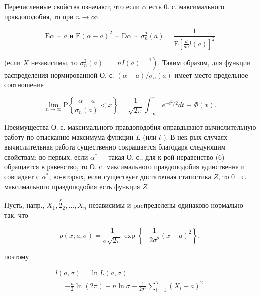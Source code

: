 \documentclass[10pt]{article}
\begin{document}
Перечисленные свойства означают, что если $\alpha$ есть 0. с. максимального правдоподобия, то при $n \rightarrow \infty$



\[

\mathrm{E} \alpha \sim a \text { и } \mathrm{E}(\alpha-a)^{2} \sim \mathrm{D} \alpha \sim \sigma_{n}^{2}(a)=\frac{1}{\mathrm{E}\left[\frac{d}{d a} l(a)\right]^{2}}

\]



(если $X$ независимы, то $\left.\sigma_{n}^{2}(a)=[n I(a)]^{-1}\right)$. Таким образом, для функции распределения нормированной О. с. $(\alpha-a) / \sigma_{n}(a)$ имеет место предельное соотношение



\[

\lim _{n \rightarrow \infty} \mathrm{P}\left\{\frac{\alpha-a}{\sigma_{n}(a)}<x\right\}=\frac{1}{\sqrt{2 \pi}} \int_{-\infty}^{x} e^{-t^{2} / 2} d t \equiv \Phi(x) .

\]



Преимущества О. с. максимального правдоподобия оправдывают вычислительную работу по отысканию максимума функции $L$ (или $l$ ). В нек-рых случаях вычислительная работа существенно сокращается благодаря следующим свойствам: во-первых, если $\alpha^{*}-$ такая О. с., для к-рой неравенство (6) обращается в равенство, то О. с. максимального правдоподобия единственна и совпадает с $\alpha^{*}$, во-вторых, если существует достаточная статистика $Z$, то 0 . с. максимального правдоподобия есть функция $Z$.



Пусть, напр., $X_{1}, \stackrel{X}{2}_{2}, \ldots, X_{n}$ независимы и pacпределены одинаково нормально так, что



\[

p(x ; a, \sigma)=\frac{1}{\sigma \sqrt{2 \pi}} \exp \left\{-\frac{1}{2 \sigma^{2}}(x-a)^{2}\right\},

\]



поэтому



\[

\begin{gathered}

l(a, \sigma)=\ln L(a, \sigma)= \\

=-\frac{n}{2} \ln (2 \pi)-n \ln \sigma-\frac{1}{2 \sigma^{2}} \sum_{i=1}^{\prime l}\left(X_{i}-a\right)^{2} .

\end{gathered}

\]
\end{document}
